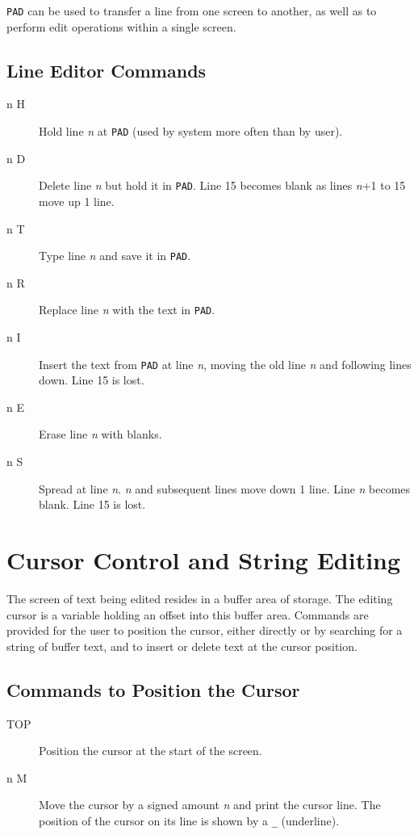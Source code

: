 \documentclass{article}
\newcommand{\n}{\textit{n}}
\begin{document}
\begin{multicols}{2}[]
	\verb|PAD| can be used to transfer a line from one screen to another,
	as well as to perform edit operations within a single screen.

	\subsection{Line Editor Commands}
	\begin{description}
		\item[n H]
			Hold line \n{} at \verb|PAD|
			(used by system more often than by user).
		\item[n D]
			Delete line \n{} but hold it in \verb|PAD|.
			Line 15 becomes blank as lines \n{}+1 to 15 move up 1 line.
		\item[n T]
			Type line \n{} and save it in \verb|PAD|.
		\item[n R]
			Replace line \n{} with the text in \verb|PAD|.
		\item[n I]
			Insert the text from \verb|PAD| at line \n{},
			moving the old line \n{} and following lines down.
			Line 15 is lost.
		\item[n E]
			Erase line \n{} with blanks.
		\item[n S]
			Spread at line \n{}. \n{} and subsequent lines
			move down 1 line. Line \n{} becomes blank.
			Line 15 is lost.
	\end{description}

	\section{Cursor Control and String Editing}

	The screen of text being edited resides in a buffer area of
	storage. The editing cursor is a variable holding an offset into
	this buffer area. Commands are provided for the user to position
	the cursor, either directly or by searching for a string of buffer
	text, and to insert or delete text at the cursor position.

	\subsection{Commands to Position the Cursor}
	\begin{description}
		\item[TOP]
			Position the cursor at the start of the screen.
		\item[n M]
			Move the cursor by a signed amount \n{} and
			print the cursor line. The position of the cursor on
			its line is shown by a \verb|_| (underline).
	\end{description}


\end{multicols}
\end{document}
